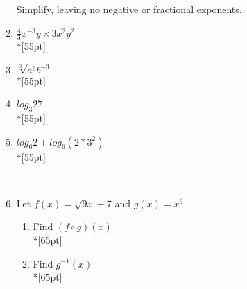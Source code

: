 \documentclass[12pt, twoside]{article}
\begin{document}
\begin{enumerate}
Simplify, leaving no negative or fractional exponents.

\item $\frac{4}{3}x^{-3}y \times 3x^2 y^{2}$\\*[55pt]
\item $\sqrt[3]{a^6 b^{-3}}$\\*[55pt]
\item $log_3 27$\\*[55pt]
\item $log_6 2 + log_6 (2*3^2)$\\*[55pt]

\
\item Let $f(x) = \sqrt{9x} +7$ and $g(x)=x^6$
\begin{enumerate}
    \item Find $(f \circ g)(x)$\\*[65pt]
    \item Find $g^{-1}(x)$\\*[65pt]
\end{enumerate}


\end{enumerate}
\end{document}
